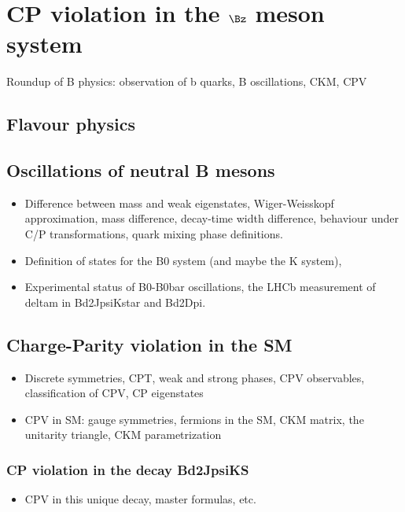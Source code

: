 
% 



\chapter{CP violation in the $\Bz$ meson system}
Roundup of B physics: observation of b quarks, B oscillations, CKM, CPV
\section{Flavour physics}
\section{Oscillations of neutral B mesons}
\begin{itemize}
  \item Difference between mass and weak eigenstates, Wiger-Weisskopf approximation, mass difference, decay-time width difference, behaviour under C/P transformations, quark mixing phase definitions.
  \item Definition of states for the B0 system (and maybe the K system), 
  \item Experimental status of B0-B0bar oscillations, the LHCb measurement of deltam in Bd2JpsiKstar and Bd2Dpi.
\end{itemize}

\section{Charge-Parity violation in the SM}
\begin{itemize}
  \item Discrete symmetries, CPT, weak and strong phases, CPV observables, classification of CPV, CP eigenstates
  \item CPV in SM: gauge symmetries, fermions in the SM, CKM matrix, the unitarity triangle, CKM parametrization
\end{itemize}
\subsection{CP violation in the decay Bd2JpsiKS}
\begin{itemize}
  \item CPV in this unique decay, master formulas, etc.
\end{itemize}

